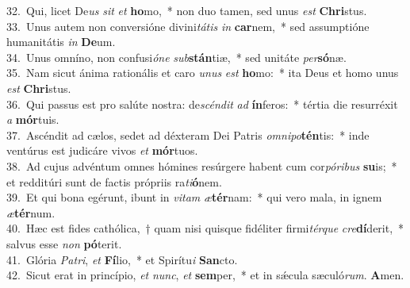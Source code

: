 {32.~}Qui, licet De\textit{us} \textit{sit} \textit{et} \textbf{ho}mo,~* non duo tamen, sed unus \textit{est} \textbf{Chri}stus.\\
{33.~}Unus autem non conversióne divini\textit{tá}\textit{tis} \textit{in} \textbf{car}nem,~* sed assumptióne humanitátis \textit{in} \textbf{De}um.\\
{34.~}Unus omníno, non confusi\textit{ó}\textit{ne} \textit{sub}\textbf{stán}tiæ,~* sed unitáte \textit{per}\textbf{só}næ.\\
{35.~}Nam sicut ánima rationális et caro \textit{u}\textit{nus} \textit{est} \textbf{ho}mo:~* ita Deus et homo unus \textit{est} \textbf{Chri}stus.\\
{36.~}Qui passus est pro salúte nostra: de\textit{scén}\textit{dit} \textit{ad} \textbf{ín}feros:~* tértia die resurréxit \textit{a} \textbf{mór}tuis.\\
{37.~}Ascéndit ad cælos, sedet ad déxteram Dei Patris \textit{om}\textit{ni}\textit{po}\textbf{tén}tis:~* inde ventúrus est judicáre vivos \textit{et} \textbf{mór}tuos.\\
{38.~}Ad cujus advéntum omnes hómines resúrgere habent cum cor\textit{pó}\textit{ri}\textit{bus} \textbf{su}is;~* et redditúri sunt de factis própriis ra\textit{ti}\textbf{ó}nem.\\
{39.~}Et qui bona egérunt, ibunt in \textit{vi}\textit{tam} \textit{æ}\textbf{tér}nam:~* qui vero mala, in ignem \textit{æ}\textbf{tér}num.\\
{40.~}Hæc est fides cathólica,~† quam nisi quisque fidéliter firmi\textit{tér}\textit{que} \textit{cre}\textbf{dí}derit,~* salvus esse \textit{non} \textbf{pó}terit.\\
{41.~}Glória \textit{Pa}\textit{tri}, \textit{et} \textbf{Fí}lio,~* et Spirítu\textit{i} \textbf{San}cto.\\
{42.~}Sicut erat in princípio, \textit{et} \textit{nunc}, \textit{et} \textbf{sem}per,~* et in sǽcula sæculó\textit{rum}. \textbf{A}men.\\
